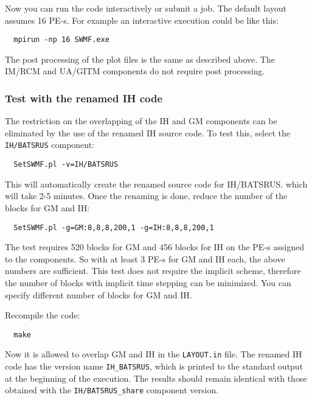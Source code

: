 \documentclass[twoside,10pt]{article}
\begin{document}
Now you can run the code interactively or submit a job.  The default
layout assumes 16 PE-s. For example an interactive execution could be
like this:
\begin{verbatim}
  mpirun -np 16 SWMF.exe
\end{verbatim}
The post processing of the plot files is the same as described above. 
The IM/RCM and UA/GITM components do not require post processing.

\subsubsection{Test with the renamed IH code}

The restriction on the overlapping of the IH and GM components
can be eliminated by the use of the renamed IH source code. 
To test this, select the {\tt IH/BATSRUS} component:
\begin{verbatim}
  SetSWMF.pl -v=IH/BATSRUS
\end{verbatim}
This will automatically create the renamed source code for IH/BATSRUS.
which will take 2-5 minutes. Once the renaming
is done, reduce the number of the blocks for GM and IH:
\begin{verbatim}
  SetSWMF.pl -g=GM:8,8,8,200,1 -g=IH:8,8,8,200,1
\end{verbatim}
The test requires 520 blocks for GM and 456 blocks for IH on the PE-s
assigned to the components. So with at least 3 PE-s for GM and IH each,
the above numbers are sufficient. This test does not require the implicit
scheme, therefore the number of blocks with implicit time stepping can
be minimized. You can specify different number of blocks for GM and IH. 

Recompile the code:
\begin{verbatim}
  make
\end{verbatim}
Now it is allowed to overlap GM and IH in the {\tt LAYOUT.in} file.
The renamed IH code has the version name {\tt IH\_BATSRUS}, 
which is printed to the standard output at the
beginning of the execution.
The results should remain identical with those obtained with the 
{\tt IH/BATSRUS\_share} component version.
\end{document}

